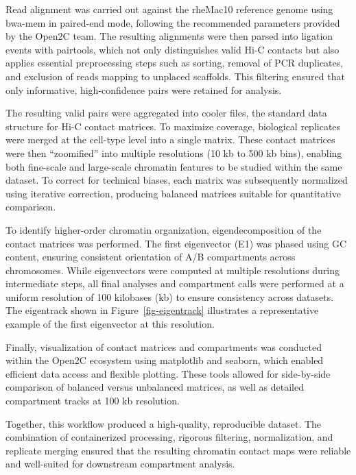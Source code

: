 \documentclass[
  a4paper,
  openany]{scrbook}
\begin{document}
Read alignment was carried out against the rheMac10 reference genome
using bwa-mem in paired-end mode, following the recommended parameters
provided by the Open2C team. The resulting alignments were then parsed
into ligation events with pairtools, which not only distinguishes valid
Hi-C contacts but also applies essential preprocessing steps such as
sorting, removal of PCR duplicates, and exclusion of reads mapping to
unplaced scaffolds. This filtering ensured that only informative,
high-confidence pairs were retained for analysis.

The resulting valid pairs were aggregated into cooler files, the
standard data structure for Hi-C contact matrices. To maximize coverage,
biological replicates were merged at the cell-type level into a single
matrix. These contact matrices were then ``zoomified'' into multiple
resolutions (10 kb to 500 kb bins), enabling both fine-scale and
large-scale chromatin features to be studied within the same dataset. To
correct for technical biases, each matrix was subsequently normalized
using iterative correction, producing balanced matrices suitable for
quantitative comparison.

To identify higher-order chromatin organization, eigendecomposition of
the contact matrices was performed. The first eigenvector (E1) was
phased using GC content, ensuring consistent orientation of A/B
compartments across chromosomes. While eigenvectors were computed at
multiple resolutions during intermediate steps, all final analyses and
compartment calls were performed at a uniform resolution of 100
kilobases (kb) to ensure consistency across datasets. The eigentrack
shown in Figure~\ref{fig-eigentrack} illustrates a representative
example of the first eigenvector at this resolution.

Finally, visualization of contact matrices and compartments was
conducted within the Open2C ecosystem using matplotlib and seaborn,
which enabled efficient data access and flexible plotting. These tools
allowed for side-by-side comparison of balanced versus unbalanced
matrices, as well as detailed compartment tracks at 100 kb resolution.

Together, this workflow produced a high-quality, reproducible dataset.
The combination of containerized processing, rigorous filtering,
normalization, and replicate merging ensured that the resulting
chromatin contact maps were reliable and well-suited for downstream
compartment analysis.
\end{document}
